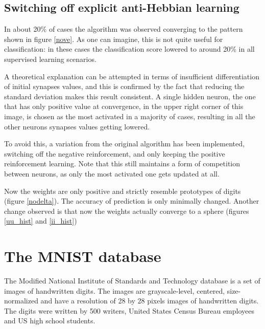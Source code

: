 \documentclass[a4paper]{report}
\begin{document}
\subsection{Switching off explicit anti-Hebbian learning}

In about 20\% of cases the algorithm was observed converging to the pattern shown in figure \ref{nove}. 
As one can imagine, this is not quite useful for classification:
in these cases the classification score lowered to around 20\% in all supervised learning scenarios.

A theoretical explanation can be attempted in terms of insufficient differentiation of initial synapses values, and this is confirmed by the fact that reducing the standard deviation makes this result consistent.
A single hidden neuron, the one that has only positive value at convergence, in the upper right corner of this image, is chosen as the most activated in a majority of cases, resulting in all the other neurons synapses values getting lowered.

To avoid this, a variation from the original algorithm has been implemented, switching off the negative reinforcement, and only keeping the positive reinforcement learning.
Note that this still maintains a form of competition between neurons, as only the most activated one gets updated at all.

Now the weights are only positive and strictly resemble prototypes of digits (figure \ref{nodelta}).
The accuracy of prediction is only minimally changed.
Another change observed is that now the weights actually converge to a sphere (figures \ref{uu_hist} and \ref{ii_hist})

\section{The MNIST database}

The Modified National Institute of Standards and Technology database is a set of images of handwritten digits. The images are grayscale-level, centered, size-normalized and have a resolution of 28 by 28 pixels images of handwritten digits.
The digits were written by 500 writers, United States Census Bureau employees and US high school students.
\end{document}

